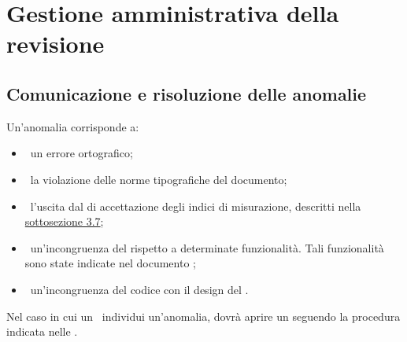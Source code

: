 
\section{Gestione amministrativa della revisione}
	\label{sec:4}
	\subsection{Comunicazione e risoluzione delle anomalie}
		\label{sec:4.1}
		Un'anomalia corrisponde a:
		\begin{itemize}
			\item\ un errore ortografico;
			\item\ la violazione delle norme tipografiche del documento;
			\item\ l'uscita dal  di accettazione degli indici di misurazione, descritti nella \hyperref[sec:3.7]{sottosezione 3.7};
			\item\ un'incongruenza del  rispetto a determinate funzionalità. Tali funzionalità sono state indicate nel documento \ARdoc;
			\item\ un'incongruenza del codice con il design del .
		\end{itemize}
		Nel caso in cui un \VER\ individui un'anomalia, dovrà aprire un  seguendo la procedura indicata nelle \NPdoc.